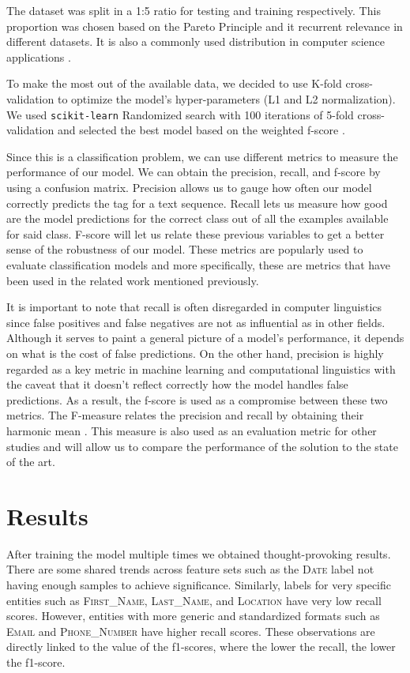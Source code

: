 \documentclass[a4paper, conference]{ieeeconf}
\begin{document}
  The dataset was split in a 1:5 ratio for testing and training respectively.
  This proportion was chosen based on the Pareto Principle and it recurrent
  relevance in different datasets. It is also a commonly used distribution in
  computer science applications \cite{Harvey2018}.

  To make the most out of the available data, we decided to use K-fold
  cross-validation to optimize the model's hyper-parameters (L1 and L2
  normalization). We used \texttt{scikit-learn} Randomized search with 100
  iterations of
  5-fold cross-validation and selected the best model based on the weighted
  f-score \cite{Pedregosa2011}.

  Since this is a classification problem, we can use different metrics to
  measure the performance of our model. We can obtain the precision, recall,
  and f-score by using a confusion matrix. Precision allows us to gauge how
  often our model correctly predicts the tag for a text sequence. Recall lets
  us measure how good are the model predictions for the correct class out of
  all the examples available for said class. F-score will let us relate these
  previous variables to get a better sense of the robustness of our model.
  These metrics are popularly used to evaluate classification models and more
  specifically, these are metrics that have been used in the related work
  mentioned previously.

  It is important to note that recall is often disregarded in computer
  linguistics since false positives and false negatives are not as influential
  as in other fields. Although it serves to paint a general picture of a
  model's performance, it depends on what is the cost of false predictions. On
  the other hand, precision is highly regarded as a key metric in machine
  learning and computational linguistics with the caveat that it doesn't
  reflect correctly how the model handles false predictions. As a result, the
  f-score is used as a compromise between these two metrics. The F-measure
  relates the precision and recall by obtaining their harmonic mean
  \cite{Powers2020}. This measure is also used as an evaluation metric for
  other studies and will allow us to compare the performance of the solution to
  the state of the art.

  \section{Results}
  After training the model multiple times we obtained thought-provoking
  results. There are some shared trends across feature sets such as the
  \textsc{Date} label not having enough samples to achieve significance.
  Similarly, labels for very specific entities such as \textsc{First\_Name},
  \textsc{Last\_Name}, and \textsc{Location} have very low recall scores.
  However, entities with more generic and standardized formats such as
  \textsc{Email} and \textsc{Phone\_Number} have higher recall scores. These
  observations are directly linked to the value of the f1-scores, where the
  lower the recall, the lower the f1-score.
\end{document}
